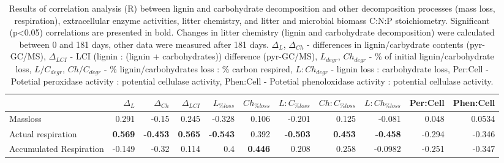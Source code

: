 \documentclass[10pt]{article}
\begin{document}
\begin{flushleft}
\newpage

%





%



\begin{landscape}

\begin{table}[h!]
\centering
\caption{Results of correlation analysis (R) between lignin and carbohydrate decomposition and other decomposition processes (mass loss, respiration), extracellular enzyme activities, litter chemistry, and litter and microbial biomass C:N:P stoichiometry. Significant (p\textless 0.05) correlations are presented in bold. Changes in litter chemistry (lignin and carbohydrate decomposition) were calculated between 0 and 181 days, other data were measured after 181 days. $\Delta _{L}$, $\Delta _{Ch}$ - differences in lignin/carbydrate contents (pyr-GC/MS), $\Delta _{LCI}$ - LCI (lignin : (lignin + carbohydrates)) difference (pyr-GC/MS), $L_{degr}$, $Ch_{degr}$ - \% of initial lignin/carbohydrate loss, $L/C_{degr}$, $Ch/C_{degr}$  - \% lignin/carbohydrates loss : \% carbon respired, $L:Ch_{degr}$ - lignin loss : carbohydrate loss, Per:Cell - Potetial peroxidase activity : potential cellulase activity, Phen:Cell - Potetial phenoloxidase activity : potential cellulase activity.} 
\label{corrtable}
{\small
\begin{tabular}{lrrrrrrrrrr}
  \hline
 & $\Delta _{L}$ & $\Delta _{Ch}$ & $\Delta _{LCI}$ & $L_{\%loss}$ & $Ch_{\%loss}$ & $L:C_{\%loss}$ & $Ch:C_{\%loss}$ & $L:Ch_{\%loss}$ & Per:Cell & Phen:Cell \\ 
  \hline
Massloss & 0.291 & -0.15 & 0.245 & -0.328 & 0.106 & -0.201 & 0.125 & -0.081 & 0.048 & 0.0534 \\ 
  Actual respiration & \textbf{ 0.569 } & \textbf{ -0.453 } & \textbf{ 0.565 } & \textbf{ -0.543 } & 0.392 & \textbf{ -0.503 } & \textbf{ 0.453 } & \textbf{ -0.458 } & -0.294 & -0.346 \\ 
  Accumulated Respiration & -0.149 & -0.32 & 0.114 &  0.4 & \textbf{ 0.446 } & 0.208 & 0.258 & -0.0982 & -0.251 & -0.347 \\ 

\end{tabular}}
\end{table}
\end{landscape}
\end{flushleft}
\end{document}
